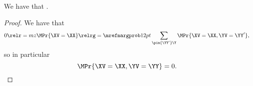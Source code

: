 \begin{proposition}
  We have that \margzimplprop.%
\end{proposition}

\begin{proof}
  We have that
  $$0 \relr = mz \MPr{\XV = \XX} \relrg = {\mrefmargprob} 12pt \sum_{\pin{\YY'}\Y} \MPr{\XV = \XX, \YV = \YY'},$$%
  so in particular 
  $$\MPr{\XV = \XX, \YV = \YY} = 0.$$%
\end{proof}
